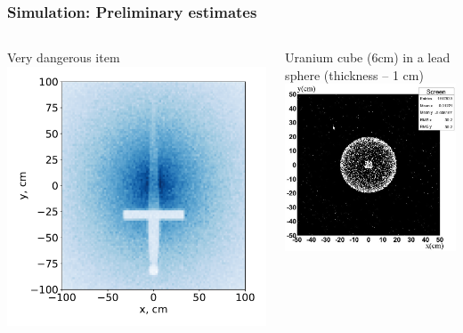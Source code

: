 \documentclass[11pt]{beamer}
\begin{document}
\begin{frame}
    \frametitle{Simulation: Preliminary estimates}
    \begin{columns}
        \begin{column}{0.5\textwidth}
            Very dangerous item\\
            \includegraphics[width=1\textwidth]{figures/Sword.pdf}
        \end{column}
        \begin{column}{0.5\textwidth}
            Uranium cube (6cm) in a lead sphere (thickness -- 1 cm)\\
            \includegraphics[width=1\textwidth]{figures/sim_cube_in_orb.jpeg}
        \end{column}
    \end{columns}  
\end{frame}
\end{document}
